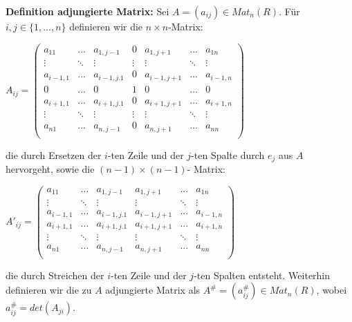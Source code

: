 \documentclass[11pt]{article}
\begin{document}
		\begin{mdframed}[backgroundcolor=blue!20]
			\textbf{Definition adjungierte Matrix:} Sei $A=(a_{ij})\in Mat_n(R)$. Für $i,j\in \{1,...,n\}$ definieren wir die $n\times n$-Matrix: \\
			\begin{center}$A_{ij}=\begin{pmatrix}
				a_{11} & ... & a_{1,j-1} & 0 & a_{1,j+1} & ... & a_{1n} \\
				\vdots & \ddots & \vdots & \vdots & \vdots & \ddots & \vdots \\
				a_{i-1,1} & ... & a_{i-1,j.1} & 0 & a_{i-1,j+1} & ... & a_{i-1,n} \\
				0 & ... & 0 & 1 & 0 & ... & 0 \\
				a_{i+1,1} & ... & a_{i+1,j.1} & 0 & a_{i+1,j+1} & ... & a_{i+1,n} \\
				\vdots & \ddots & \vdots & \vdots & \vdots & \ddots & \vdots \\
				a_{n1} & ... & a_{n,j-1} & 0 & a_{n,j+1} & ... & a_{nn} \\
			\end{pmatrix}$\end{center}
			die durch Ersetzen der $i$-ten Zeile und der $j$-ten Spalte durch $e_j$ aus $A$ hervorgeht, sowie die $(n-1)\times(n-1)$-
			Matrix: \\
			\begin{center}$A'_{ij}=\begin{pmatrix}
				a_{11} & ... & a_{1,j-1} & a_{1,j+1} & ... & a_{1n} \\
				\vdots & \ddots & \vdots & \vdots & \ddots & \vdots \\
				a_{i-1,1} & ... & a_{i-1,j.1} & a_{i-1,j+1} & ... & a_{i-1,n} \\
				a_{i+1,1} & ... & a_{i+1,j.1} & a_{i+1,j+1} & ... & a_{i+1,n} \\
				\vdots & \ddots & \vdots & \vdots & \ddots & \vdots \\
				a_{n1} & ... & a_{n,j-1} & a_{n,j+1} & ... & a_{nn} \\
			\end{pmatrix}$\end{center}
			die durch Streichen der $i$-ten Zeile und der $j$-ten Spalten entsteht. Weiterhin definieren wir die zu $A$ adjungierte Matrix 
			als $A^\#=(a_{ij}^\#)\in Mat_n(R)$, wobei $a_{ij}^\#=det(A_{ji})$.
		\end{mdframed}
		
\end{document}

